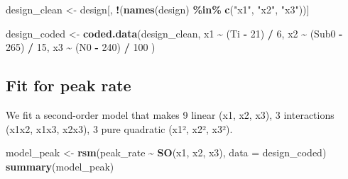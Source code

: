 \documentclass[
]{article}
\newenvironment{Shaded}{\begin{snugshade}}{\end{snugshade}}
\newcommand{\AttributeTok}[1]{\textcolor[rgb]{0.13,0.29,0.53}{#1}}
\newcommand{\DecValTok}[1]{\textcolor[rgb]{0.00,0.00,0.81}{#1}}
\newcommand{\FunctionTok}[1]{\textcolor[rgb]{0.13,0.29,0.53}{\textbf{#1}}}
\newcommand{\NormalTok}[1]{#1}
\newcommand{\OtherTok}[1]{\textcolor[rgb]{0.56,0.35,0.01}{#1}}
\newcommand{\SpecialCharTok}[1]{\textcolor[rgb]{0.81,0.36,0.00}{\textbf{#1}}}
\newcommand{\StringTok}[1]{\textcolor[rgb]{0.31,0.60,0.02}{#1}}
\begin{document}
\begin{Shaded}
\begin{Highlighting}[]
\NormalTok{design\_clean }\OtherTok{\textless{}{-}}\NormalTok{ design[, }\SpecialCharTok{!}\NormalTok{(}\FunctionTok{names}\NormalTok{(design) }\SpecialCharTok{\%in\%} \FunctionTok{c}\NormalTok{(}\StringTok{"x1"}\NormalTok{, }\StringTok{"x2"}\NormalTok{, }\StringTok{"x3"}\NormalTok{))]}

\NormalTok{design\_coded }\OtherTok{\textless{}{-}} \FunctionTok{coded.data}\NormalTok{(design\_clean,}
\NormalTok{                            x1 }\SpecialCharTok{\textasciitilde{}}\NormalTok{ (Ti }\SpecialCharTok{{-}} \DecValTok{21}\NormalTok{) }\SpecialCharTok{/} \DecValTok{6}\NormalTok{,}
\NormalTok{                            x2 }\SpecialCharTok{\textasciitilde{}}\NormalTok{ (Sub0 }\SpecialCharTok{{-}} \DecValTok{265}\NormalTok{) }\SpecialCharTok{/} \DecValTok{15}\NormalTok{,}
\NormalTok{                            x3 }\SpecialCharTok{\textasciitilde{}}\NormalTok{ (N0 }\SpecialCharTok{{-}} \DecValTok{240}\NormalTok{) }\SpecialCharTok{/} \DecValTok{100}
\NormalTok{)}
\end{Highlighting}
\end{Shaded}

\subsection{Fit for peak rate}\label{fit-for-peak-rate}

We fit a second-order model that makes 9 linear (x1, x2, x3), 3
interactions (x1x2, x1x3, x2x3), 3 pure quadratic (x1², x2², x3²).

\begin{Shaded}
\begin{Highlighting}[]
\NormalTok{model\_peak }\OtherTok{\textless{}{-}} \FunctionTok{rsm}\NormalTok{(peak\_rate }\SpecialCharTok{\textasciitilde{}} \FunctionTok{SO}\NormalTok{(x1, x2, x3), }\AttributeTok{data =}\NormalTok{ design\_coded)}
\FunctionTok{summary}\NormalTok{(model\_peak)}
\end{Highlighting}
\end{Shaded}
\end{document}
